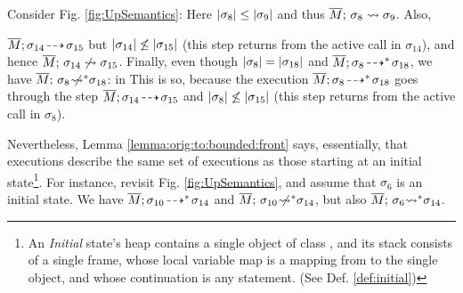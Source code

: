 Consider    Fig. \ref{fig:UpSemantics}:
Here $|\sigma_8| \leq |\sigma_9|$ and thus $\overline{M};\, {\sigma_8} \rightsquigarrow \sigma_9$. Also,  {$\overline{M};\sigma_{14}\! \dashrightarrow\! {\sigma_{15}}$  but  $|\sigma_{14}| \not\leq |\sigma_{15}| $  (this step returns from the active call in $\sigma_{14}$), and hence   $\overline{M};\, {\sigma_{14}} \not\rightsquigarrow \sigma_{15}$. 
Finally, even though $|\sigma_8| = |\sigma_{18}|$
 and $\overline{M};\sigma_8\! \dashrightarrow^*\! {\sigma_{18}}$, we have  
 $\overline{M};\, {\sigma_8} \not\!\!\!{\rightsquigarrow^*} \sigma_{18}$: in 
This is so, because the execution $\overline{M};\sigma_8\! \dashrightarrow^*\! {\sigma_{18}}$ goes through the step
$\overline{M};\sigma_{14}\! \dashrightarrow\! {\sigma_{15}}$ and  $|\sigma_{8}| \not\leq |\sigma_{15}| $
 (this step returns from the active call in  $\sigma_8$).

\vspace{.1cm}
Nevertheless, Lemma \ref{lemma:orig:to:bounded:front} says, essentially,  that \scoped executions describe the same set of executions as those  starting at an initial state\footnote{An \emph{Initial} state's heap contains a single object of class , and
its  stack   consists of a single frame, whose local variable map is a mapping from  to the single object, and whose continuation is  any statement.
(See Def. \ref{def:initial})}.   
For instance, revisit  Fig. \ref{fig:UpSemantics}, and assume that $\sigma_6$ is an initial state.
We have  $\overline{M};\sigma_{10}\! \dashrightarrow^*\! {\sigma_{14}}$ and $ \overline{M};\, {\sigma_{10}} \not\!\!\!{\rightsquigarrow^*} \sigma_{14}$, but also 
 $\overline{M};\, {\sigma_{6}} {\rightsquigarrow^*} \sigma_{14}$. %


}
